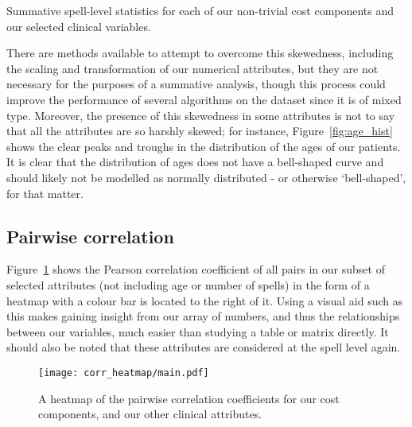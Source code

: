 \begin{table}[h]
    \resizebox{\textwidth}{!}{%
        
    }
    \resizebox{\textwidth}{!}{%
        
    }
    \resizebox{\textwidth}{!}{%
        
    }
    \caption{Summative spell-level statistics for each of our non-trivial cost
    components and our selected clinical variables.}\label{tab:summative}
\end{table}

There are methods available to attempt to overcome this skewedness, including
the scaling and transformation of our numerical attributes, but they are not
necessary for the purposes of a summative analysis, though this process could
improve the performance of several algorithms on the dataset since it is of
mixed type. Moreover, the presence of this skewedness in some attributes is not
to say that all the attributes are so harshly skewed; for instance,
Figure~\ref{fig:age_hist} shows the clear peaks and troughs in the distribution
of the ages of our patients. It is clear that the distribution of ages does not
have a bell-shaped curve and should likely not be modelled as normally
distributed \-- or otherwise `bell-shaped', for that matter.

\subsection{Pairwise correlation}\label{subsec:corr}

Figure~\ref{fig:corr_heatmap} shows the Pearson correlation coefficient of all
pairs in our subset of selected attributes (not including age or number of
spells) in the form of a heatmap with a colour bar is located to the right of
it. Using a visual aid such as this makes gaining insight from our array of
numbers, and thus the relationships between our variables, much easier than
studying a table or matrix directly. It should also be noted that these
attributes are considered at the spell level again.

\begin{figure}[h!]
    \vspace{-50pt}%
    \texttt{[image: corr\_heatmap/main.pdf]}
    \caption{A heatmap of the pairwise correlation coefficients for our cost
    components, and our other clinical attributes.}\label{fig:corr_heatmap}
\end{figure}
